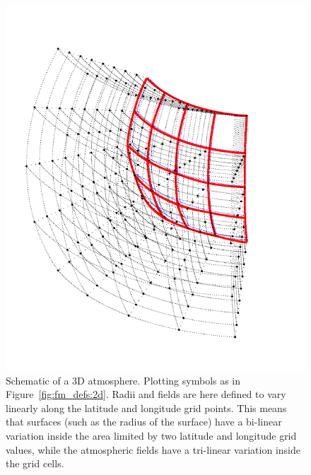\begin{figure}[!p]
 \begin{center}
  \includegraphics*[angle=-90,width=0.98\hsize]{Figs/fm_definitions/atm_dim_3d}
  \vspace*{-15mm}
  \caption{Schematic of a 3D atmosphere. Plotting symbols as in 
    Figure~\ref{fig:fm_defs:2d}. Radii and fields are here defined to
    vary linearly along the latitude and longitude grid points. This
    means that surfaces (such as the radius of the surface) have a
    bi-linear variation inside the area limited by two latitude and
    longitude grid values, while the atmospheric fields have a
    tri-linear variation inside the grid cells. }
  \label{fig:fm_defs:3d}
 \end{center}
\end{figure}

